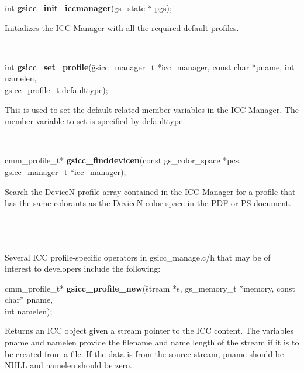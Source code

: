 \documentclass[12pt,notitlepage]{article}
\begin{document}
\begin{tabbing}
\noindent int {\bf gsicc\_init\_iccmanager}(gs\_state * pgs);\\
\end{tabbing}

\begin{minipage}[h]{6.0in}
Initializes the ICC Manager with all the required default profiles.
\end{minipage}\\

\begin{tabbing}
\noindent int {\bf gsicc\_set\_profile}(\=gsicc\_manager\_t *icc\_manager, const char *pname, int namelen, \\
\>gsicc\_profile\_t defaulttype);\\
\end{tabbing}

\begin{minipage}[h]{6.0in}
This is used to set the default related member variables in the ICC Manager.  The member variable to set is specified by defaulttype.
\end{minipage}\\

\begin{tabbing}
\noindent cmm\_profile\_t* {\bf gsicc\_finddevicen}(const gs\_color\_space *pcs, gsicc\_manager\_t *icc\_manager);\\
\end{tabbing}

\begin{minipage}[h]{6.0in}
Search the DeviceN profile array contained in the ICC Manager for a profile that has the same colorants as the DeviceN color space in the PDF or PS document.
\end{minipage}\\ \\ \\


\noindent Several ICC profile-specific operators in gsicc\_manage.c/h that may be of interest to developers include the following:\\

\begin{tabbing}
\noindent cmm\_profile\_t* {\bf gsicc\_profile\_new}(\=stream *s, gs\_memory\_t *memory, const char* pname, \\
\>int namelen);\\
\end{tabbing}

\begin{minipage}[h]{6.0in}
Returns an ICC object given a stream pointer to the ICC content.  The variables pname and namelen provide the filename and name length of the stream if it is to be created from a file.  If the data is from the source stream, pname should be NULL and namelen should be zero.
\end{minipage}\\
\\
\end{document}
